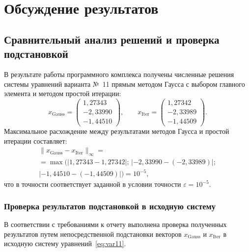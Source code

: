 \chapter{Обсуждение результатов}

\section{Сравнительный анализ решений и проверка подстановкой}

В результате работы программного комплекса получены численные решения системы уравнений варианта №~11 прямым методом Гаусса с выбором главного элемента и методом простой итерации:
\begin{equation}
    x_{\text{Gauss}} = \begin{pmatrix} 1{,}27343 \\ -2{,}33990 \\ -1{,}44510 \end{pmatrix},
    \qquad
    x_{\text{Iter}} = \begin{pmatrix} 1{,}27342 \\ -2{,}33989 \\ -1{,}44509 \end{pmatrix}.
\end{equation}
Максимальное расхождение между результатами методов Гаусса и простой итерации составляет:
\begin{multline}
    \|x_{\text{Gauss}} - x_{\text{Iter}}\|_\infty = \\
    = \max\big(|1{,}27343 - 1{,}27342|;\, |-2{,}33990 - (-2{,}33989)|; \\
    |-1{,}44510 - (-1{,}44509)|\big) = 10^{-5},
\end{multline}
что в точности соответствует заданной в условии точности $\varepsilon = 10^{-5}$.

\subsection{Проверка результатов подстановкой в исходную систему}

В соответствии с требованиями к отчету выполнена проверка полученных результатов путем непосредственной подстановки векторов $x_{\text{Gauss}}$ и $x_{\text{Iter}}$ в исходную систему уравнений~\eqref{eq:var11}.

